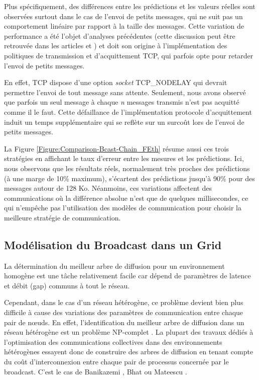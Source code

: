Plus spécifiquement, des différences entre les prédictions et les
valeurs réelles sont observées surtout dans le cas de l'envoi de petits messages, qui ne suit pas un comportement linéaire
par rapport à la taille des messages. Cette variation de performance
a été l'objet d'analyses précédentes (cette discussion peut être retrouvée
dans les articles \cite{Steffenel04a} et \cite{Steffenel04c}) et doit son origine à l'implémentation des politiques de 
transmission et d'acquittement TCP, qui parfois opte pour retarder l'envoi de petits messages. 

En effet, TCP dispose d'une option \emph{socket} TCP\_NODELAY qui devrait permettre l'envoi de tout message sans attente. 
Seulement, nous avons observé que parfois un seul message
à chaque \emph{n} messages transmis n'est pas acquitté comme il le
faut. Cette défaillance de l'implémentation protocole d'acquittement induit un temps supplémentaire
 qui se reflète sur un surcoût lors de l'envoi de petits messages.  


La Figure \ref{Figure:Comparison-Bcast-Chain_FEth} résume aussi ces trois stratégies en affichant le taux d'erreur entre les mesures et les prédictions.
Ici, nous observons que les résultats réels, normalement très proches
des prédictions (à une marge de 10\% maximum), s'écartent des prédictions
jusqu'à 90\% pour des messages autour de 128 Ko. Néanmoins, ces variations
affectent des communications où la différence absolue n'est que de
quelques millisecondes, ce qui n'empêche pas l'utilisation des modèles
de communication pour choisir la meilleure stratégie de communication. 


\subsection{Modélisation du Broadcast dans un Grid}

La détermination du meilleur arbre de diffusion pour un environnement
homogène est une tâche relativement facile car dépend de paramètres de latence et débit (gap) communs à tout le réseau.  

Cependant, dans le cas d'un réseau hétérogène, ce problème devient
bien plus difficile à cause des variations des paramètres de communication entre chaque pair de n{\oe}uds. En effet, l'identification du meilleur arbre
de diffusion dans un réseau hétérogène est un problème NP-complet \cite{Bhat99}\cite{Beaumont04c,Beaumont05b}\cite{PangfengLiu04}.
La plupart des travaux dédiés à l'optimisation des communications
collectives dans des environnements hétérogènes essayent donc de construire des arbres de diffusion en tenant compte du coût d'interconnexion entre chaque pair de processus concernée par le broadcast. C'est le cas de Banikazemi \cite{Banikazemi98},
Bhat \cite{Bhat99,Bhat03} ou Mateescu \cite{Mateescu05}.

